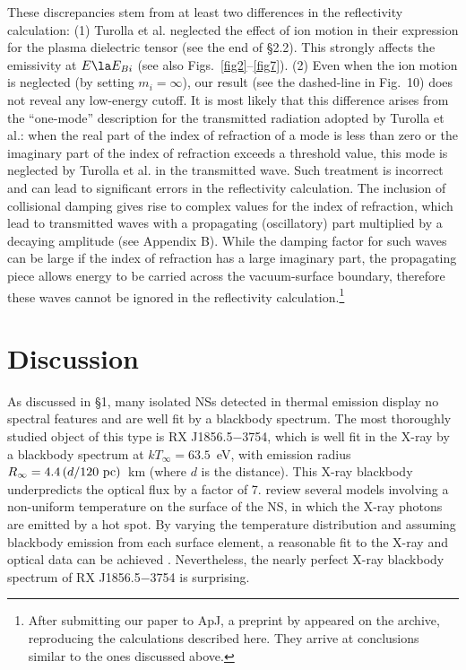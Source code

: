 \documentclass{emulateapj}
\begin{document}
These discrepancies stem from at least 
two differences in the reflectivity calculation: 
(1) Turolla et al. neglected the effect of ion motion in 
their expression for the plasma dielectric tensor (see 
the end of \S 2.2). This strongly 
affects the emissivity at $E\la E_{Bi}$ (see also Figs.~\ref{fig2}--\ref{fig7}).
(2) Even when the ion motion is neglected (by setting $m_i=\infty$),
our result (see the dashed-line in Fig.~10) does not reveal any low-energy 
cutoff. It is most likely that this difference arises from 
the ``one-mode'' description for the transmitted radiation adopted by
Turolla et al.: when the real part of the index of refraction of a mode is 
less than zero or the imaginary part of the index of refraction exceeds 
a threshold value, this mode is neglected by Turolla et al.
in the transmitted wave. Such treatment is incorrect and can lead
to significant errors in the reflectivity calculation. 
The inclusion of collisional damping gives rise to complex values for 
the index of refraction, which lead to transmitted 
waves with a propagating (oscillatory) part multiplied by a 
decaying amplitude (see Appendix B). While the damping factor for such 
waves can be large if the index of refraction has a large imaginary part, 
the propagating piece allows energy to be carried across the vacuum-surface 
boundary, therefore these waves cannot be ignored in the reflectivity 
calculation.\footnote{After submitting our paper to ApJ, a preprint 
by \cite{perez-azorin} appeared on the archive, reproducing the calculations 
described here.  They arrive at conclusions similar to the ones discussed above.}


\section{Discussion}
\label{sect:Concl}

As discussed in \S 1, many isolated NSs detected in thermal emission 
display no spectral features and are well fit by a blackbody spectrum. 
The most thoroughly studied object of this type is RX J1856.5$-$3754,
which is well fit in the X-ray by a blackbody spectrum at 
$kT_\infty=63.5$~eV, with emission radius 
$R_\infty=4.4\,(d/120~{\rm pc})$~km (where $d$ is the distance).
This X-ray blackbody underpredicts the optical flux by a factor of 7. 
\citet{PZ03} review several models involving a non-uniform 
temperature on the surface of the NS, in which the 
X-ray photons are emitted by a hot spot. By varying the temperature
distribution and assuming blackbody emission from each surface element,
a reasonable fit to the X-ray and optical data can be achieved
\citep[see also][]{BrajeRomani,Truemper-ea}.
Nevertheless, the nearly perfect X-ray blackbody spectrum of 
RX J1856.5$-$3754 is surprising.
\end{document}
